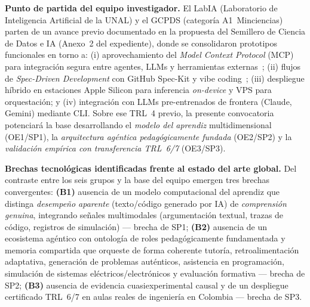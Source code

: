 
\textbf{Punto de partida del equipo investigador.}
El LabIA (Laboratorio de Inteligencia Artificial de la UNAL) y el GCPDS (categoría A1~Minciencias) parten de un avance previo documentado en la propuesta del Semillero de Ciencia de Datos e IA (Anexo~2 del expediente), donde se consolidaron prototipos funcionales en torno a: (i) aprovechamiento del \emph{Model Context Protocol} (MCP) para integración segura entre agentes, LLMs y herramientas externas~\cite{roitman2026guide}; (ii) flujos de \emph{Spec-Driven Development} con GitHub Spec-Kit y vibe coding~\cite{piskala2026sdd,feng2026ssde}; (iii) despliegue híbrido en estaciones Apple Silicon para inferencia \emph{on-device} y VPS para orquestación; y (iv) integración con LLMs pre-entrenados de frontera (Claude, Gemini) mediante CLI. Sobre ese TRL~4 previo, la presente convocatoria potenciará la base desarrollando el \emph{modelo del aprendiz} multidimensional (OE1/SP1), la \emph{arquitectura agéntica pedagógicamente fundada} (OE2/SP2) y la \emph{validación empírica con transferencia TRL~6/7} (OE3/SP3).

\textbf{Brechas tecnológicas identificadas frente al estado del arte global.}
Del contraste entre los seis grupos y la base del equipo emergen tres brechas convergentes: \textbf{(B1)} ausencia de un modelo computacional del aprendiz que distinga \emph{desempeño aparente} (texto/código generado por IA) de \emph{comprensión genuina}, integrando señales multimodales (argumentación textual, trazas de código, registros de simulación) — brecha de SP1; \textbf{(B2)} ausencia de un ecosistema agéntico con ontología de roles pedagógicamente fundamentada y memoria compartida que orqueste de forma coherente tutoría, retroalimentación adaptativa, generación de problemas auténticos, asistencia en programación, simulación de sistemas eléctricos/electrónicos y evaluación formativa — brecha de SP2; \textbf{(B3)} ausencia de evidencia cuasiexperimental causal y de un despliegue certificado TRL~6/7 en aulas reales de ingeniería en Colombia — brecha de SP3.


